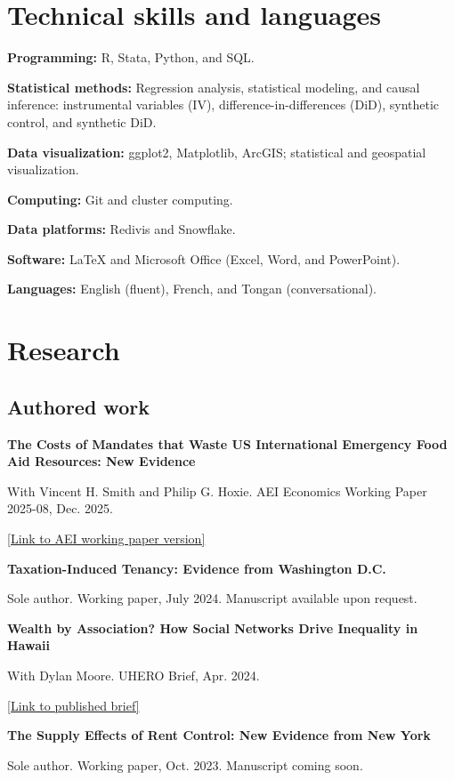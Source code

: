 \documentclass[10pt,letterpaper]{article}
\begin{document}
\section*{Technical skills and languages}
\textbf{Programming:} R, Stata, Python, and SQL.\par
\textbf{Statistical methods:} Regression analysis, statistical modeling, and causal inference: instrumental variables (IV), difference-in-differences (DiD), synthetic control, and synthetic DiD.\par
\textbf{Data visualization:} ggplot2, Matplotlib, ArcGIS; statistical and geospatial visualization.\par
\textbf{Computing:} Git and cluster computing.\par
\textbf{Data platforms:} Redivis and Snowflake.\par
\textbf{Software:} LaTeX and Microsoft Office (Excel, Word, and PowerPoint).\par
\textbf{Languages:} English (fluent), French, and Tongan (conversational).\par
\newpage
\begingroup\setlength{\parskip}{0.5pt}

\section*{Research}

\subsection*{Authored work}
\textbf{The Costs of Mandates that Waste US International Emergency Food Aid Resources: New Evidence}\par
With Vincent H. Smith and Philip G. Hoxie. {\small AEI Economics Working Paper 2025-08, Dec. 2025.} \par{\small \href{https://www.aei.org/wp-content/uploads/2025/12/The-Costs-of-Mandates-that-Waste-US-4.pdf}{[Link to AEI working paper version]}} \par\vspace{2pt}
\textbf{Taxation-Induced Tenancy: Evidence from Washington D.C.}\par
Sole author. {\small Working paper, July 2024.} {\small Manuscript available upon request.} \par\vspace{2pt}
\textbf{Wealth by Association? How Social Networks Drive Inequality in Hawaii}\par
With Dylan Moore. {\small UHERO Brief, Apr. 2024.} \par{\small \href{https://uhero.hawaii.edu/wp-content/uploads/2024/04/WealthByAssociationHowSocialNetworksDriveInequalityInHawaii.pdf}{[Link to published brief]}} \par\vspace{2pt}
\textbf{The Supply Effects of Rent Control: New Evidence from New York}\par
Sole author. {\small Working paper, Oct. 2023.} {\small Manuscript coming soon.} \par\vspace{2pt}
\end{document}
